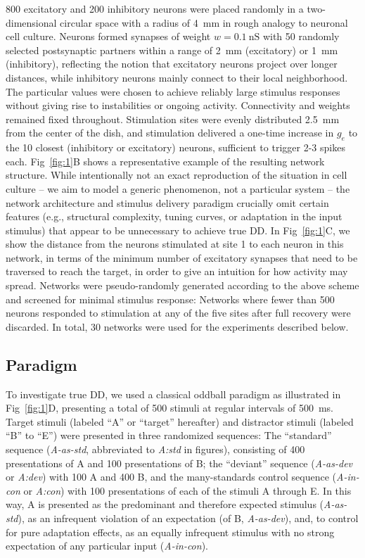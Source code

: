 \documentclass[10pt,letterpaper]{article}
\newcommand{\dev}{\textit{A-as-dev}}
\newcommand{\msc}{\textit{A-in-con}}
\newcommand{\std}{\textit{A-as-std}}
\newcommand{\FIG}[1]{Fig~\ref{fig:#1}}
\begin{document}
800 excitatory and 200 inhibitory neurons were placed randomly in a two-dimensional circular space with a radius of \qty{4}{\milli\meter} in rough analogy to neuronal cell culture. Neurons formed synapses of weight $w = \qty{0.1}{\nano\siemens}$ with 50 randomly selected postsynaptic partners within a range of \qty{2}{\milli\meter} (excitatory) or \qty{1}{\milli\meter} (inhibitory), reflecting the notion that excitatory neurons project over longer distances, while inhibitory neurons mainly connect to their local neighborhood. The particular values were chosen to achieve reliably large stimulus responses without giving rise to instabilities or ongoing activity. Connectivity and weights remained fixed throughout. Stimulation sites were evenly distributed \qty{2.5}{\milli\meter} from the center of the dish, and stimulation delivered a one-time increase in $g_e$ to the 10 closest (inhibitory or excitatory) neurons, sufficient to trigger 2-3 spikes each. \FIG{1}B shows a representative example of the resulting network structure. While intentionally not an exact reproduction of the situation in cell culture -- we aim to model a generic phenomenon, not a particular system -- the network architecture and stimulus delivery paradigm crucially omit certain features (e.g., structural complexity, tuning curves, or adaptation in the input stimulus) that appear to be unnecessary to achieve true DD. In \FIG{1}C, we show the distance from the neurons stimulated at site 1 to each neuron in this network, in terms of the minimum number of excitatory synapses that need to be traversed to reach the target, in order to give an intuition for how activity may spread. Networks were pseudo-randomly generated according to the above scheme and screened for minimal stimulus response: Networks where fewer than 500 neurons responded to stimulation at any of the five sites after full recovery were discarded. In total, 30 networks were used for the experiments described below.

\subsection*{Paradigm}

To investigate true DD, we used a classical oddball paradigm as illustrated in \FIG{1}D, presenting a total of 500 stimuli at regular intervals of \qty{500}{\milli\second}. Target stimuli (labeled ``A'' or ``target'' hereafter) and distractor stimuli (labeled ``B'' to ``E'') were presented in three randomized sequences: The ``standard'' sequence (\std{}, abbreviated to \textit{A:std} in figures), consisting of 400 presentations of A and 100 presentations of B; the ``deviant'' sequence (\dev{} or \textit{A:dev}) with 100 A and 400 B, and the many-standards control sequence (\msc{} or \textit{A:con}) with 100 presentations of each of the stimuli A through E. In this way, A is presented as the predominant and therefore expected stimulus (\std{}), as an infrequent violation of an expectation (of B, \dev{}), and, to control for pure adaptation effects, as an equally infrequent stimulus with no strong expectation of any particular input (\msc{}).
\end{document}
